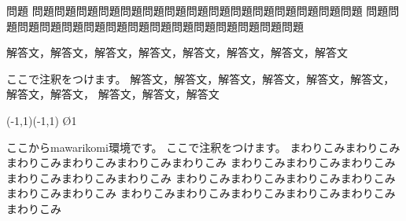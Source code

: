 \begin{itembox}{問題}
問題問題問題問題問題問題問題問題問題問題問題問題問題問題問題
問題問題問題問題問題問題問題問題問題問題問題問題問題問題問題
\end{itembox}
\begin{tyuukai}
解答文，解答文，解答文，解答文，解答文，解答文，解答文，解答文

ここで注釈をつけます。
解答文，解答文，解答文，解答文，解答文，解答文，解答文，解答文，
解答文，解答文，解答文

\begin{mawarikomi}{}{%
  \begin{zahyou*}[ul=1cm](-1,1)(-1,1)
    \Drawline{\LT\LB\RB\RT\LT}
    \En\O1
  \end{zahyou*}}
\indent ここから\textsf{mawarikomi}環境です。
ここで注釈をつけます。
まわりこみまわりこみまわりこみまわりこみまわりこみまわりこみ
まわりこみまわりこみまわりこみまわりこみまわりこみまわりこみ
まわりこみまわりこみまわりこみまわりこみまわりこみまわりこみ
まわりこみまわりこみまわりこみまわりこみまわりこみまわりこみ
\end{mawarikomi}
\end{tyuukai}
